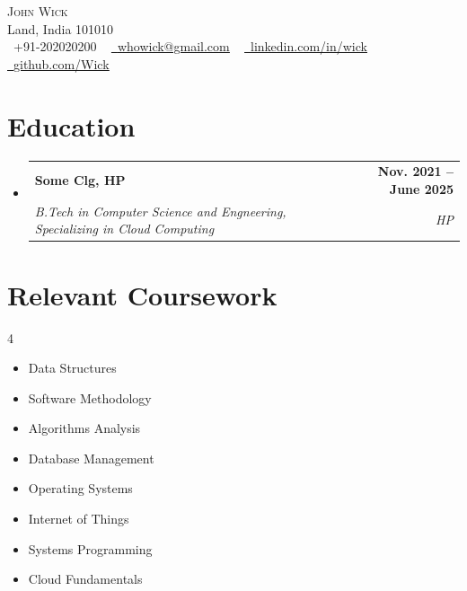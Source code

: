 \documentclass[letterpaper,11pt]{article}
\makeatletter
\newcommand{\resumeSubheading}[4]{
  \vspace{-2pt}\item
    \begin{tabular*}{1.0\textwidth}[t]{l@{\extracolsep{\fill}}r}
      \textbf{#1} & \textbf{\small #2} \\
      \textit{\small#3} & \textit{\small #4} \\
    \end{tabular*}\vspace{-7pt}
}
\newcommand{\resumeSubHeadingListStart}{\begin{itemize}[leftmargin=0.0in, label={}]}
\newcommand{\resumeSubHeadingListEnd}{\end{itemize}}
\makeatother
\begin{document}

\begin{center}
    {\Huge \scshape John Wick} \\ \vspace{1pt}
    Land, India 101010 \\ \vspace{1pt}
    \small \raisebox{-0.1\height}\faPhone\ +91-202020200 ~ \href{mailto:x@gmail.com}{\raisebox{-0.2\height}\faEnvelope\  \underline{whowick@gmail.com}} ~ 
    \href{https://linkedin.com/in//}{\raisebox{-0.2\height}\faLinkedin\ \underline{linkedin.com/in/wick}}  ~
    \href{https://github.com/}{\raisebox{-0.2\height}\faGithub\ \underline{github.com/Wick}}
    \vspace{-8pt}
\end{center}


\section{Education}
  \resumeSubHeadingListStart
    \resumeSubheading
      {Some Clg, HP}{Nov. 2021 -- June 2025}
      {B.Tech in Computer Science and Engneering, Specializing in Cloud Computing}{HP}
  \resumeSubHeadingListEnd

\section{Relevant Coursework}
        \begin{multicols}{4}
            \begin{itemize}[itemsep=-5pt, parsep=3pt]
                \item\small Data Structures
                \item Software Methodology
                \item Algorithms Analysis
                \item Database Management
                \item Operating Systems
                \item Internet of Things
                \item Systems Programming
                \item Cloud Fundamentals
            \end{itemize}
        \end{multicols}
        \vspace*{2.0\multicolsep}
\end{document}
